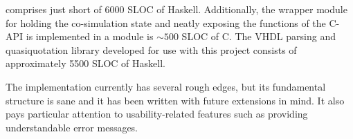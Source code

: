 \libsme{} comprises just short of 6000 SLOC of Haskell. Additionally, the
wrapper module for holding the co-simulation state and neatly exposing the
functions of the C-API is implemented in a module is $\sim 500$ SLOC of C. The
VHDL parsing and quasiquotation library developed for use with this project
consists of approximately 5500 SLOC of Haskell.

The implementation currently has several rough edges, but its fundamental
structure is sane and it has been written with future extensions in mind. It
also pays particular attention to usability-related features such as providing
understandable error messages.

